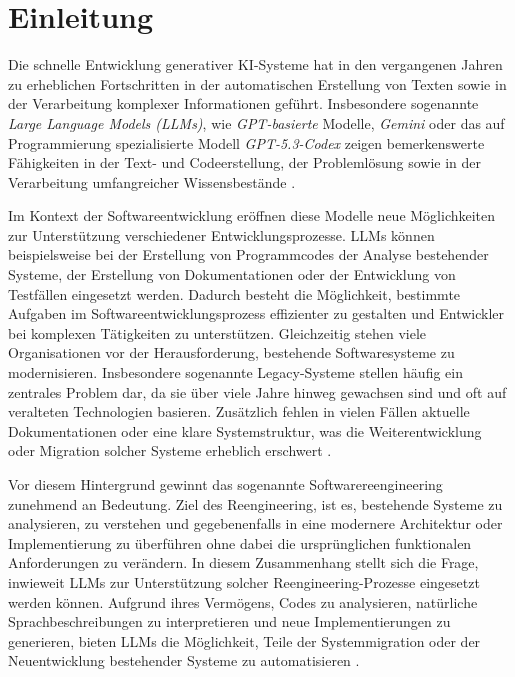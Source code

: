 \chapter{Einleitung}
Die schnelle Entwicklung generativer KI-Systeme hat in den vergangenen Jahren zu erheblichen Fortschritten in der automatischen Erstellung von Texten sowie in der Verarbeitung komplexer Informationen geführt. Insbesondere sogenannte \textit{Large Language Models (LLMs)}, wie \textit{GPT-basierte} Modelle, \textit{Gemini} oder das auf Programmierung spezialisierte Modell \textit{GPT-5.3-Codex} zeigen bemerkenswerte Fähigkeiten in der Text- und Codeerstellung, der Problemlösung sowie in der Verarbeitung umfangreicher Wissensbestände \cite{brown2020languagemodelsfewshotlearners}.

Im Kontext der Softwareentwicklung eröffnen diese Modelle neue Möglichkeiten zur Unterstützung verschiedener Entwicklungsprozesse. LLMs können beispielsweise bei der Erstellung von Programmcodes der Analyse bestehender Systeme, der Erstellung von Dokumentationen oder der Entwicklung von Testfällen eingesetzt werden. Dadurch besteht die Möglichkeit, bestimmte Aufgaben im Softwareentwicklungsprozess effizienter zu gestalten und Entwickler bei komplexen Tätigkeiten zu unterstützen.
Gleichzeitig stehen viele Organisationen vor der Herausforderung, bestehende Softwaresysteme zu modernisieren. Insbesondere sogenannte Legacy-Systeme stellen häufig ein zentrales Problem dar, da sie über viele Jahre hinweg gewachsen sind und oft auf veralteten Technologien basieren. Zusätzlich fehlen in vielen Fällen aktuelle Dokumentationen oder eine klare Systemstruktur, was die Weiterentwicklung oder Migration solcher Systeme erheblich erschwert \cite{chen2021evaluatinglargelanguagemodels}.

Vor diesem Hintergrund gewinnt das sogenannte Softwarereengineering zunehmend an Bedeutung. Ziel des Reengineering, ist es, bestehende Systeme zu analysieren, zu verstehen und gegebenenfalls in eine modernere Architektur oder Implementierung zu überführen ohne dabei die ursprünglichen funktionalen Anforderungen zu verändern.
In diesem Zusammenhang stellt sich die Frage, inwieweit LLMs zur Unterstützung solcher Reengineering-Prozesse eingesetzt werden können. Aufgrund ihres Vermögens, Codes zu analysieren, natürliche Sprachbeschreibungen zu interpretieren und neue Implementierungen zu generieren, bieten LLMs die Möglichkeit, Teile der Systemmigration oder der Neuentwicklung bestehender Systeme zu automatisieren \cite{schlossarczyk2025ailegacy}.

